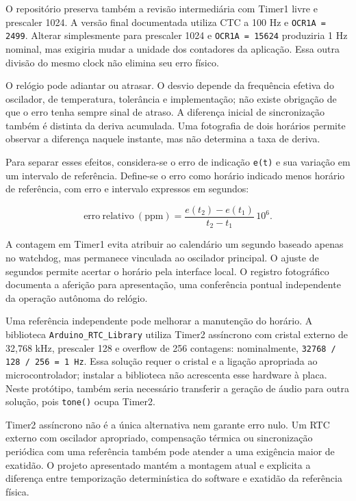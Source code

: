 O repositório preserva também a revisão intermediária com Timer1 livre e prescaler 1024. A versão final documentada utiliza CTC a 100 Hz e \texttt{OCR1A = 2499}. Alterar simplesmente para prescaler 1024 e \texttt{OCR1A = 15624} produziria 1 Hz nominal, mas exigiria mudar a unidade dos contadores da aplicação. Essa outra divisão do mesmo clock não elimina seu erro físico.

O relógio pode adiantar ou atrasar. O desvio depende da frequência efetiva do oscilador, de temperatura, tolerância e implementação; não existe obrigação de que o erro tenha sempre sinal de atraso. A diferença inicial de sincronização também é distinta da deriva acumulada. Uma fotografia de dois horários permite observar a diferença naquele instante, mas não determina a taxa de deriva.

Para separar esses efeitos, considera-se o erro de indicação \texttt{e(t)} e sua variação em um intervalo de referência. Define-se o erro como horário indicado menos horário de referência, com erro e intervalo expressos em segundos:

\[\mathrm{erro\ relativo\ (ppm)}=\frac{e(t_2)-e(t_1)}{t_2-t_1}\,10^6.\]

A contagem em Timer1 evita atribuir ao calendário um segundo baseado apenas no watchdog, mas permanece vinculada ao oscilador principal. O ajuste de segundos permite acertar o horário pela interface local. O registro fotográfico documenta a aferição para apresentação, uma conferência pontual independente da operação autônoma do relógio.

Uma referência independente pode melhorar a manutenção do horário. A biblioteca \texttt{Arduino\_RTC\_Library} utiliza Timer2 assíncrono com cristal externo de 32,768 kHz, prescaler 128 e overflow de 256 contagens: nominalmente, \texttt{32768 / 128 / 256 = 1 Hz}. Essa solução requer o cristal e a ligação apropriada ao microcontrolador; instalar a biblioteca não acrescenta esse hardware à placa. Neste protótipo, também seria necessário transferir a geração de áudio para outra solução, pois \texttt{tone()} ocupa Timer2. \autocite{fonte15}

Timer2 assíncrono não é a única alternativa nem garante erro nulo. Um RTC externo com oscilador apropriado, compensação térmica ou sincronização periódica com uma referência também pode atender a uma exigência maior de exatidão. O projeto apresentado mantém a montagem atual e explicita a diferença entre temporização determinística do software e exatidão da referência física.

